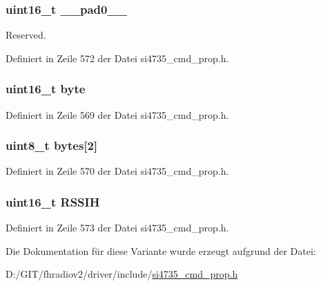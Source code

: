 \subsubsection[{\+\_\+\+\_\+pad0\+\_\+\+\_\+}]{\setlength{\rightskip}{0pt plus 5cm}uint16\+\_\+t \+\_\+\+\_\+pad0\+\_\+\+\_\+}\label{unionfm__rsq__rssi__hi__thres_a77132c2c26a75f5b8751b235cda23828}


Reserved. 



Definiert in Zeile 572 der Datei si4735\+\_\+cmd\+\_\+prop.\+h.

\hypertarget{unionfm__rsq__rssi__hi__thres_ab0549c1b5ea980a02e7eab77e21fea49}{}
\subsubsection[{byte}]{\setlength{\rightskip}{0pt plus 5cm}uint16\+\_\+t byte}\label{unionfm__rsq__rssi__hi__thres_ab0549c1b5ea980a02e7eab77e21fea49}


Definiert in Zeile 569 der Datei si4735\+\_\+cmd\+\_\+prop.\+h.

\hypertarget{unionfm__rsq__rssi__hi__thres_a46e4c05d20a047ec169f60d3167e912e}{}
\subsubsection[{bytes}]{\setlength{\rightskip}{0pt plus 5cm}uint8\+\_\+t bytes\mbox{[}2\mbox{]}}\label{unionfm__rsq__rssi__hi__thres_a46e4c05d20a047ec169f60d3167e912e}


Definiert in Zeile 570 der Datei si4735\+\_\+cmd\+\_\+prop.\+h.

\hypertarget{unionfm__rsq__rssi__hi__thres_a949ca6113ffa5c822708fdecf9415838}{}
\subsubsection[{R\+S\+S\+I\+H}]{\setlength{\rightskip}{0pt plus 5cm}uint16\+\_\+t R\+S\+S\+I\+H}\label{unionfm__rsq__rssi__hi__thres_a949ca6113ffa5c822708fdecf9415838}


Definiert in Zeile 573 der Datei si4735\+\_\+cmd\+\_\+prop.\+h.



Die Dokumentation für diese Variante wurde erzeugt aufgrund der Datei\+:\begin{DoxyCompactItemize}
\item 
D\+:/\+G\+I\+T/fhradiov2/driver/include/\hyperlink{si4735__cmd__prop_8h}{si4735\+\_\+cmd\+\_\+prop.\+h}\end{DoxyCompactItemize}

